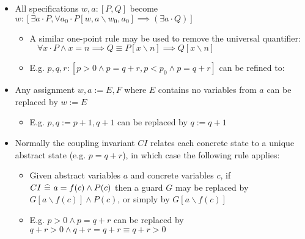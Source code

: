 \begin{itemize}
\begin{itemize}
		\item All specifications $ w, a : [P, Q] $ become $ w : [\exists a \cdot P, \forall a_0 \cdot P[w, a \backslash w_0, a_0] \implies (\exists a \cdot Q)] $
		
		\begin{itemize}
			
			\item A similar one-point rule may be used to remove the universal quantifier:\\
			$~~~~ \forall x \cdot P \land x = n \implies Q \equiv P[x \backslash n] \implies Q[x \backslash n] $
			
			\item E.g. $ p, q, r : [p > 0 \land p = q + r, p < p_0 \land p = q + r] $ can be refined to:\\
			
		\end{itemize}
	
		\item Any assignment $ w, a := E, F $ where $ E $ contains no variables from $ a $ can be replaced by $ w := E $
		
		\begin{itemize}
			
			\item E.g. $ p, q := p + 1, q + 1 $ can be replaced by $ q := q + 1 $
			
		\end{itemize}
		
		\item Normally the coupling invariant $ CI $ relates each concrete state to a unique abstract state (e.g. $ p = q + r $), in which case the following rule applies:
		
		\begin{itemize}
			
			\item Given abstract variables $ a $ and concrete variables $ c $, if $ CI ~ \widehat{=} ~ a = f(c) \land P(c) $ then a guard $ G $ may be replaced by $ G[a \backslash f(c)] \land P(c)$, or simply by $ G[a \backslash f(c)] $
			
			\item E.g. $ p > 0 \land p = q + r $ can be replaced by $ q + r > 0 \land q + r = q + r \equiv q + r > 0 $
			
		\end{itemize}
		
	\end{itemize}
	
\end{itemize}